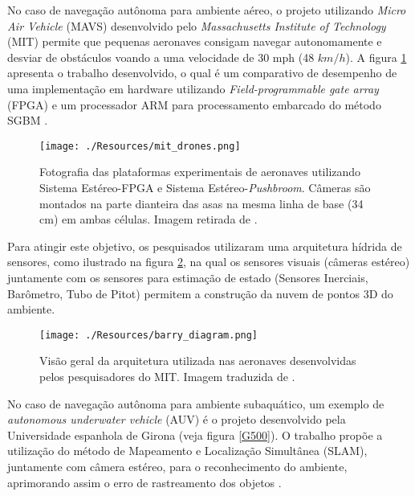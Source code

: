 No caso de navegação autônoma para ambiente aéreo, o projeto utilizando \textit{Micro Air Vehicle} (MAVS) desenvolvido pelo \textit{Massachusetts Institute of Technology} (MIT) permite que pequenas aeronaves consigam navegar autonomamente e desviar de obstáculos voando a uma velocidade de 30 mph (48 $km/h$). A figura \ref{mit_drones} apresenta o trabalho desenvolvido, o qual é um comparativo de desempenho de uma implementação em hardware utilizando \textit{Field-programmable gate array} (FPGA) e um processador ARM para processamento embarcado do método SGBM \cite{BarryMIT}.


\begin{figure}[]
 	\centering
 	\texttt{[image: ./Resources/mit\_drones.png]}
 	\caption{Fotografia das plataformas experimentais de aeronaves utilizando Sistema Estéreo-FPGA e Sistema Estéreo-\textit{Pushbroom}. Câmeras são montados na parte dianteira das asas na mesma linha de base (34 cm) em ambas células. Imagem retirada de \cite{BarryMIT}.}
 	\label{mit_drones}
\end{figure}

Para atingir este objetivo, os pesquisados utilizaram uma arquitetura hídrida de sensores, como ilustrado na figura \ref{barry_diagram}, na qual os sensores visuais (câmeras estéreo) juntamente com os sensores para estimação de estado (Sensores Inerciais, Barômetro, Tubo de Pitot) permitem a construção da nuvem de pontos 3D do ambiente.

\begin{figure}[]
 	\centering
 	\texttt{[image: ./Resources/barry\_diagram.png]}
 	\caption{Visão geral da arquitetura utilizada nas aeronaves desenvolvidas pelos pesquisadores do MIT. Imagem traduzida de \cite{Barry2014}.}
 	\label{barry_diagram}
\end{figure}


No caso de navegação autônoma para ambiente subaquático, um exemplo de \textit{autonomous underwater vehicle} (AUV) é o projeto desenvolvido pela Universidade espanhola de Girona (veja figura \ref{G500}). O trabalho propõe a utilização do método de Mapeamento e Localização Simultânea (SLAM), juntamente com câmera estéreo, para o reconhecimento do ambiente, aprimorando assim o erro de rastreamento dos objetos \cite{Nagappa2013}.


